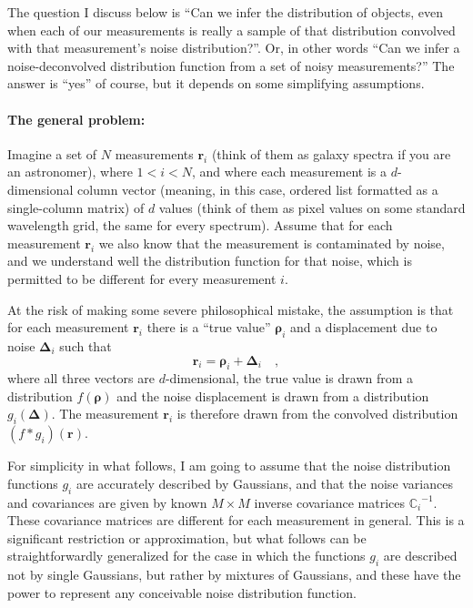 \documentclass[12pt]{article}
\newcommand{\Mvector}[1]{\boldsymbol{#1}}
\newcommand{\measurement}{\Mvector{r}}
\newcommand{\truepoint}{\Mvector{\rho}}
\newcommand{\noise}{\Mvector{\Delta}}
\newcommand{\measurementi}{\measurement_i}
\newcommand{\truepointi}{\truepoint_i}
\newcommand{\noisei}{\noise_i}
\newcommand{\truedist}{f}
\newcommand{\noisedisti}{g_i}
\newcommand{\Mmatrix}[1]{\mathbb{#1}}
\newcommand{\covari}{\Mmatrix{C}_i}
\newcommand{\inverse}[1]{{#1}^{-1}}
\newcommand{\invcovari}{\inverse{\covari}}
\begin{document}
The question I discuss below is ``Can we infer the distribution of
objects, even when each of our measurements is really a sample of that
distribution convolved with that measurement's noise distribution?''.
Or, in other words ``Can we infer a noise-deconvolved distribution
function from a set of noisy measurements?''  The answer is ``yes'' of
course, but it depends on some simplifying assumptions.

\paragraph{The general problem:}
Imagine a set of $N$ measurements $\measurementi$ (think of them as
galaxy spectra if you are an astronomer), where $1<i<N$, and where
each measurement is a $d$-dimensional column vector (meaning, in this
case, ordered list formatted as a single-column matrix) of $d$ values
(think of them as pixel values on some standard wavelength grid, the
same for every spectrum).  Assume that for each measurement
$\measurementi$ we also know that the measurement is contaminated by
noise, and we understand well the distribution function for that
noise, which is permitted to be different for every measurement $i$.

At the risk of making some severe philosophical mistake, the
assumption is that for each measurement $\measurementi$ there is a
``true value'' $\truepointi$ and a displacement due to noise $\noisei$
such that
\begin{equation}
\measurementi=\truepointi+\noisei
\quad ,
\end{equation}
where all three vectors are $d$-dimensional, the true value is drawn
from a distribution $\truedist(\truepoint)$ and the noise displacement is
drawn from a distribution $\noisedisti(\noise)$.  The measurement
$\measurementi$ is therefore drawn from the convolved distribution
$(\truedist * \noisedisti)(\measurement)$.

For simplicity in what follows, I am going to assume that the noise
distribution functions $\noisedisti$ are accurately described by
Gaussians, and that the noise variances and covariances are given by
known $M\times M$ inverse covariance matrices $\invcovari$.  These
covariance matrices are different for each measurement in general.
This is a significant restriction or approximation, but what follows
can be straightforwardly generalized for the case in which the
functions $\noisedisti$ are described not by single Gaussians, but
rather by mixtures of Gaussians, and these have the power to represent
any conceivable noise distribution function.
\end{document}
